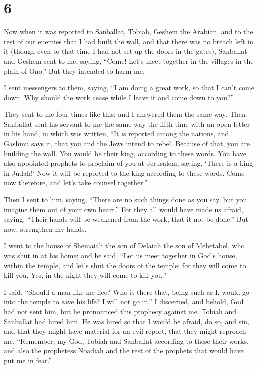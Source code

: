 \hypertarget{section-5}{%
\section{6}\label{section-5}}

 Now when it was reported to Sanballat, Tobiah, Geshem the
Arabian, and to the rest of our enemies that I had built the wall, and
that there was no breach left in it (though even to that time I had not
set up the doors in the gates),  Sanballat and Geshem sent
to me, saying, ``Come! Let's meet together in the villages in the plain
of Ono.'' But they intended to harm me.

 I sent messengers to them, saying, ``I am doing a great
work, so that I can't come down. Why should the work cease while I leave
it and come down to you?''

 They sent to me four times like this; and I answered them
the same way.  Then Sanballat sent his servant to me the
same way the fifth time with an open letter in his hand, 
in which was written, ``It is reported among the nations, and Gashmu
says it, that you and the Jews intend to rebel. Because of that, you are
building the wall. You would be their king, according to these words.
 You have also appointed prophets to proclaim of you at
Jerusalem, saying, `There is a king in Judah!' Now it will be reported
to the king according to these words. Come now therefore, and let's take
counsel together.''

 Then I sent to him, saying, ``There are no such things
done as you say, but you imagine them out of your own heart.''
 For they all would have made us afraid, saying, ``Their
hands will be weakened from the work, that it not be done.'' But now,
strengthen my hands.

 I went to the house of Shemaiah the son of Delaiah the
son of Mehetabel, who was shut in at his home; and he said, ``Let us
meet together in God's house, within the temple, and let's shut the
doors of the temple; for they will come to kill you. Yes, in the night
they will come to kill you.''

 I said, ``Should a man like me flee? Who is there that,
being such as I, would go into the temple to save his life? I will not
go in.''  I discerned, and behold, God had not sent him,
but he pronounced this prophecy against me. Tobiah and Sanballat had
hired him.  He was hired so that I would be afraid, do
so, and sin, and that they might have material for an evil report, that
they might reproach me.  ``Remember, my God, Tobiah and
Sanballat according to these their works, and also the prophetess
Noadiah and the rest of the prophets that would have put me in fear.''

